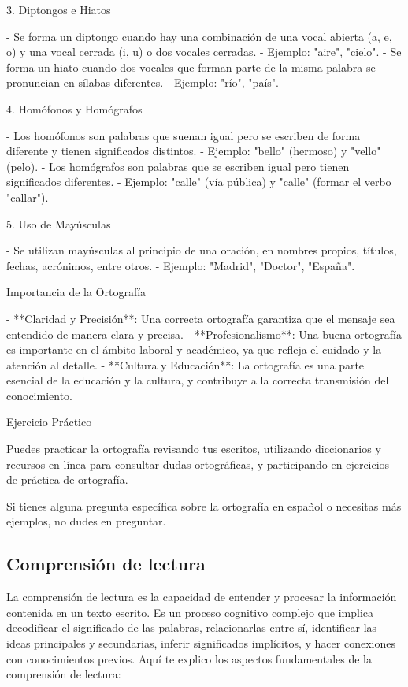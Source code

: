 3. Diptongos e Hiatos

- Se forma un diptongo cuando hay una combinación de una vocal abierta (a, e, o) y una vocal cerrada (i, u) o dos vocales cerradas.
- Ejemplo: "aire", "cielo".
- Se forma un hiato cuando dos vocales que forman parte de la misma palabra se pronuncian en sílabas diferentes.
- Ejemplo: "río", "país".

4. Homófonos y Homógrafos

- Los homófonos son palabras que suenan igual pero se escriben de forma diferente y tienen significados distintos.
- Ejemplo: "bello" (hermoso) y "vello" (pelo).
- Los homógrafos son palabras que se escriben igual pero tienen significados diferentes.
- Ejemplo: "calle" (vía pública) y "calle" (formar el verbo "callar").

5. Uso de Mayúsculas

- Se utilizan mayúsculas al principio de una oración, en nombres propios, títulos, fechas, acrónimos, entre otros.
- Ejemplo: "Madrid", "Doctor", "España".

Importancia de la Ortografía

- **Claridad y Precisión**: Una correcta ortografía garantiza que el mensaje sea entendido de manera clara y precisa.
- **Profesionalismo**: Una buena ortografía es importante en el ámbito laboral y académico, ya que refleja el cuidado y la atención al detalle.
- **Cultura y Educación**: La ortografía es una parte esencial de la educación y la cultura, y contribuye a la correcta transmisión del conocimiento.

Ejercicio Práctico

Puedes practicar la ortografía revisando tus escritos, utilizando diccionarios y recursos en línea para consultar dudas ortográficas, y participando en ejercicios de práctica de ortografía.

Si tienes alguna pregunta específica sobre la ortografía en español o necesitas más ejemplos, no dudes en preguntar.

\subsection{Comprensión de lectura}

La comprensión de lectura es la capacidad de entender y procesar la información contenida en un texto escrito. Es un proceso cognitivo complejo que implica decodificar el significado de las palabras, relacionarlas entre sí, identificar las ideas principales y secundarias, inferir significados implícitos, y hacer conexiones con conocimientos previos. Aquí te explico los aspectos fundamentales de la comprensión de lectura:

